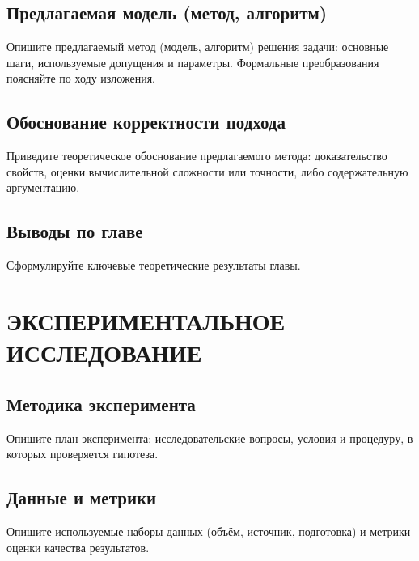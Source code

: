\documentclass[12pt,a4paper]{extreport}
\begin{document}
\section{Предлагаемая модель (метод, алгоритм)}
Опишите предлагаемый метод (модель, алгоритм) решения задачи: основные
шаги, используемые допущения и параметры. Формальные преобразования
поясняйте по ходу изложения.

\section{Обоснование корректности подхода}
Приведите теоретическое обоснование предлагаемого метода: доказательство
свойств, оценки вычислительной сложности или точности, либо
содержательную аргументацию.

\section{Выводы по главе}
Сформулируйте ключевые теоретические результаты главы.

\clearpage

\chapter{ЭКСПЕРИМЕНТАЛЬНОЕ ИССЛЕДОВАНИЕ}

\section{Методика эксперимента}
Опишите план эксперимента: исследовательские вопросы, условия и
процедуру, в которых проверяется гипотеза.

\section{Данные и метрики}
Опишите используемые наборы данных (объём, источник, подготовка) и
метрики оценки качества результатов.
\end{document}
